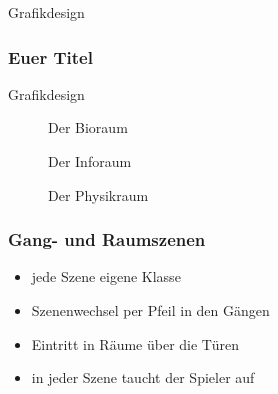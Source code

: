 \begin{frame}
	\begin{center}
		\Huge Grafikdesign
	\end{center}
\end{frame}

\begin{frame}
	\frametitle{Euer Titel}
\end{frame}

\begin{frame}{Grafikdesign}
	\begin{minipage}[v]{0.3 \textwidth}
		\begin{figure}
			\centering
			\caption[Bioraum]{Der Bioraum}
			\label{fig:Bioraum}
		\end{figure}
	\end{minipage}

\vfill

\begin{minipage}[v]{0.3 \textwidth}
	\begin{figure}
		\centering
		\caption[Inforaum]{Der Inforaum}
		\label{fig:Inforaum}
	\end{figure}
\end{minipage}

\vfill

\begin{minipage}[v]{0.3 \textwidth}
	\begin{figure}
		\centering
		\caption[Physikraum]{Der Physikraum}
		\label{fig:Physikraum}
	\end{figure}
\end{minipage}
	
\end{frame}

\begin{frame}
	\begin{minipage}{0.3\textwidth}
		\begin{figure}
			\centering
			\label{fig:kt_farbverlauf}
		\end{figure}
	\end{minipage}
\end{frame}

\begin{frame}
	\frametitle{Gang- und Raumszenen}
	\begin{itemize}
		\item jede Szene eigene Klasse
		\item Szenenwechsel per Pfeil in den Gängen
		\item Eintritt in Räume über die Türen
		\item in jeder Szene taucht der Spieler auf
	\end{itemize}
\end{frame}

